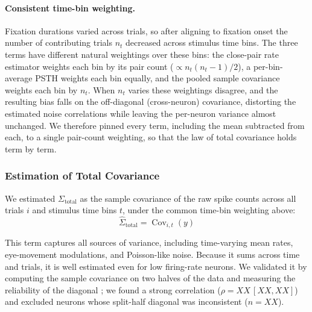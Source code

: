 \documentclass{lite}
\newcommand{\C}{\operatorname{Cov}}
\newcommand{\Ctotal}{\Sigma_{\text{total}}}
\begin{document}
\paragraph{Consistent time-bin weighting.} Fixation durations varied across trials, so after aligning to fixation onset the number of contributing trials $n_t$ decreased across stimulus time bins. The three terms have different natural weightings over these bins: the close-pair rate estimator weights each bin by its pair count ($\propto n_t(n_t-1)/2$), a per-bin-average PSTH weights each bin equally, and the pooled sample covariance weights each bin by $n_t$. When $n_t$ varies these weightings disagree, and the resulting bias falls on the off-diagonal (cross-neuron) covariance, distorting the estimated noise correlations while leaving the per-neuron variance almost unchanged. We therefore pinned every term, including the mean subtracted from each, to a single pair-count weighting, so that the law of total covariance holds term by term.

\subsubsection{Estimation of Total Covariance}
We estimated $\Ctotal$ as the sample covariance of the raw spike counts across all trials $i$ and stimulus time bins $t$, under the common time-bin weighting above:
\begin{equation}
    \hat{\Sigma}_{\text{total}} = \C_{i,t}(y)
\end{equation}

This term captures all sources of variance, including time-varying mean rates, eye-movement modulations, and Poisson-like noise. Because it sums across time and trials, it is well estimated even for low firing-rate neurons. We validated it by computing the sample covariance on two halves of the data and measuring the reliability of the diagonal \cite{stringer2019spontaneous}; we found a strong correlation ($\rho = XX\,[XX, XX]$) and excluded neurons whose split-half diagonal was inconsistent ($n = XX$).
\end{document}
